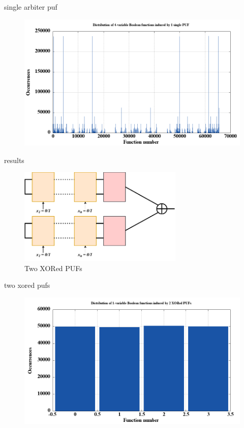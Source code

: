 \documentclass[10pt, compress]{beamer}
\begin{document}
\begin{frame}{single arbiter puf}
    \begin{figure}
        \centering
        \includegraphics[width=\textwidth]{figures/dist/distribution_of_4-variable_boolean_functions_induced_by_1_single_puf.png}
    \end{figure}
\end{frame}


\begin{frame}{results}
    \begin{figure}
        \centering
        \includegraphics[width=0.7\textwidth]{figures/puf_2_xor.pdf}
        \caption{Two XORed PUFs}
    \end{figure}
\end{frame}

\begin{frame}{two xored pufs}
    \begin{figure}
        \centering
        \includegraphics[width=\textwidth]{figures/dist/distribution_of_1-variable_boolean_functions_induced_by_2_xored_pufs.png}
    \end{figure}
\end{frame}
\end{document}
